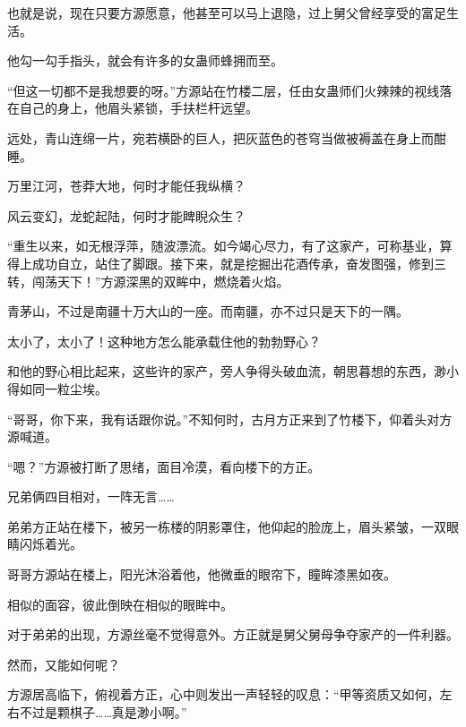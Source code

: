 \begin{this_body}
也就是说，现在只要方源愿意，他甚至可以马上退隐，过上舅父曾经享受的富足生活。

他勾一勾手指头，就会有许多的女蛊师蜂拥而至。

“但这一切都不是我想要的呀。”方源站在竹楼二层，任由女蛊师们火辣辣的视线落在自己的身上，他眉头紧锁，手扶栏杆远望。

远处，青山连绵一片，宛若横卧的巨人，把灰蓝色的苍穹当做被褥盖在身上而酣睡。

万里江河，苍莽大地，何时才能任我纵横？

风云变幻，龙蛇起陆，何时才能睥睨众生？

“重生以来，如无根浮萍，随波漂流。如今竭心尽力，有了这家产，可称基业，算得上成功自立，站住了脚跟。接下来，就是挖掘出花酒传承，奋发图强，修到三转，闯荡天下！”方源深黑的双眸中，燃烧着火焰。

青茅山，不过是南疆十万大山的一座。而南疆，亦不过只是天下的一隅。

太小了，太小了！这种地方怎么能承载住他的勃勃野心？

和他的野心相比起来，这些许的家产，旁人争得头破血流，朝思暮想的东西，渺小得如同一粒尘埃。

“哥哥，你下来，我有话跟你说。”不知何时，古月方正来到了竹楼下，仰着头对方源喊道。

“嗯？”方源被打断了思绪，面目冷漠，看向楼下的方正。

兄弟俩四目相对，一阵无言……

弟弟方正站在楼下，被另一栋楼的阴影罩住，他仰起的脸庞上，眉头紧皱，一双眼睛闪烁着光。

哥哥方源站在楼上，阳光沐浴着他，他微垂的眼帘下，瞳眸漆黑如夜。

相似的面容，彼此倒映在相似的眼眸中。

对于弟弟的出现，方源丝毫不觉得意外。方正就是舅父舅母争夺家产的一件利器。

然而，又能如何呢？

方源居高临下，俯视着方正，心中则发出一声轻轻的叹息：“甲等资质又如何，左右不过是颗棋子……真是渺小啊。”

\end{this_body}

